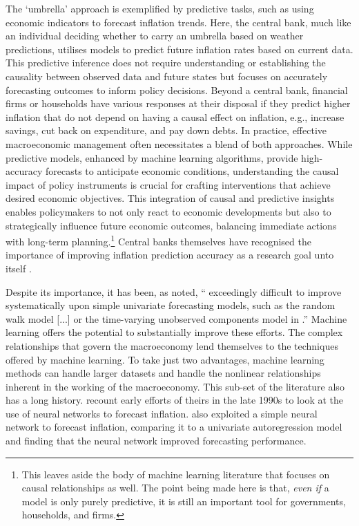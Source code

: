 The `umbrella' approach is exemplified by predictive tasks, such as using economic indicators to forecast inflation trends. Here, the central bank, much like an individual deciding whether to carry an umbrella based on weather predictions, utilises models to predict future inflation rates based on current data. This predictive inference does not require understanding or establishing the causality between observed data and future states but focuses on accurately forecasting outcomes to inform policy decisions. Beyond a central bank, financial firms or households have various responses at their disposal if they predict higher inflation that do not depend on having a causal effect on inflation, e.g., increase savings, cut back on expenditure, and pay down debts. In practice, effective macroeconomic management often necessitates a blend of both approaches. While predictive models, enhanced by machine learning algorithms, provide high-accuracy forecasts to anticipate economic conditions, understanding the causal impact of policy instruments is crucial for crafting interventions that achieve desired economic objectives. This integration of causal and predictive insights enables policymakers to not only react to economic developments but also to strategically influence future economic outcomes, balancing immediate actions with long-term planning.\footnote{This leaves aside the body of machine learning literature that focuses on causal relationships as well. The point being made here is that, \textit{even if} a model is only purely predictive, it is still an important tool for governments, households, and firms.} Central banks themselves have recognised the importance of improving inflation prediction accuracy as a research goal unto itself \autocite{Chakraborty2017MachineBanks,SmalterHall2018MachineForecasting}.


Despite its importance, it has been, as \textcite{Stock2010ModelingCrisis} noted, `` exceedingly difficult to improve systematically upon simple univariate forecasting models, such as the \textcite{Atkeson2001AreInflation} random walk model [...] or the time-varying unobserved components model in \textcite{Stock2007WhyForecast}.” Machine learning offers the potential to substantially improve these efforts. The complex relationships that govern the macroeconomy lend themselves to the techniques offered by machine learning. To take just two advantages, machine learning methods can handle larger datasets and handle the nonlinear relationships inherent in the working of the macroeconomy. This sub-set of the literature also has a long history. \textcite{Stock2023ASeries} recount early efforts of theirs in the late 1990s to look at the use of neural networks to forecast inflation. \textcite{Nakamura2005InflationNetwork} also exploited a simple neural network to forecast inflation, comparing it to a univariate autoregression model and finding that the neural network improved forecasting performance. 

